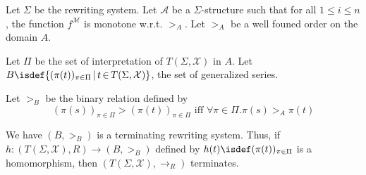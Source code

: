     \begin{definition}
        Let $\Sigma$ be the rewriting system. 
        Let $\mathcal{A}$ be a $\Sigma$-structure such that for all $1 \leq i \leq n$, the function $f^\mathcal{M}$ is monotone w.r.t. $>_A$. Let $>_A$ be a well founed order on the domain $A$.

        Let $\Pi$ be the set of interpretation of $T(\Sigma,\mathcal{X})$ in $A$.
        Let $B\isdef \{(\pi(t))_{\pi\in \Pi} \mathop{\mid} t \mathop{\in} T(\Sigma,\mathcal{X})\}$, the set of generalized series. 

        Let $>_B$ be the binary relation defined by 
        $$(\pi(s))_{\pi\in \Pi} \mathop{>} (\pi(t))_{\pi\in \Pi} \text{ iff } \forall \pi \mathop{\in} \Pi. \pi(s) >_A \pi(t)$$


        We have $(B, >_B)$ is a terminating rewriting system. Thus, if $h:(T(\Sigma,\mathcal{X}),R) \mathop{\to} (B,>_B)$ defined by $h(t) \isdef (\pi(t))_{\pi\in \Pi}$ is a homomorphism, then $(T(\Sigma,\mathcal{X}), \mathop{\to} _R)$ terminates.
    \end{definition}